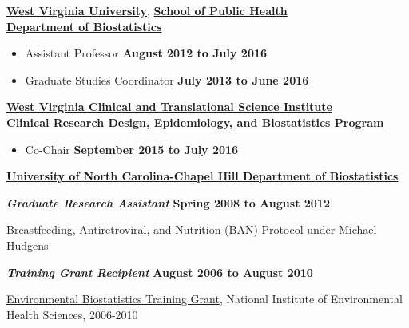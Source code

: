 \documentclass[10pt]{article}
\newenvironment{outerlist}[1][\enskip\textbullet]%
        {\begin{itemize}[#1]}{\end{itemize}%
         \vspace{-.6\baselineskip}}
\newenvironment{innerlist}[1][\enskip\textbullet]%
        {\begin{compactitem}[#1]}{\end{compactitem}}
\newcommand{\blankline}{\quad\pagebreak[2]}
\begin{document}
\blankline


\href{http://www.wvu.edu/}{\textbf{West Virginia University}}, \href{http://publichealth.hsc.wvu.edu/}{\textbf{School of Public Health}}\\
\href{http://publichealth.hsc.wvu.edu/biostatistics}{\textbf{Department of Biostatistics}}
\begin{outerlist}
\item[] {Assistant Professor} \normalfont%
				\hfill \textbf{August 2012 to July 2016}
				\item[] {Graduate Studies Coordinator} \normalfont%
        \hfill \textbf{July 2013 to June 2016}
\end{outerlist}

\blankline

\href{http://http://www.wvctsi.org/}{\textbf{West Virginia Clinical and Translational Science Institute}}\\
\href{http://http://www.wvctsi.org/programs/epidemiology-biostatistics/}{\textbf{Clinical Research Design, Epidemiology, and Biostatistics Program}}
\begin{outerlist}
\item[] {Co-Chair}\normalfont%
        \hfill \textbf{September 2015 to July 2016}
\end{outerlist}

\blankline

\href{http://www.bios.unc.edu}{\textbf{University of North Carolina-Chapel Hill Department of Biostatistics}}
\begin{outerlist}

\item[] \textit{\bf Graduate Research Assistant} \normalfont%
        \hfill \textbf{Spring 2008 to August 2012}
\begin{innerlist}
        \item Breastfeeding, Antiretroviral, and Nutrition (BAN) Protocol under Michael Hudgens
\end{innerlist}

\item[] \textit{\bf Training Grant Recipient}\normalfont%
        \hfill \textbf{August 2006 to August 2010}
        \begin{innerlist}
        \item \href{http://www.sph.unc.edu/bios/available_awards_175_6208.html#traininggrants}{Environmental Biostatistics Training Grant}, National Institute of Environmental Health Sciences, 2006-2010\\
\end{innerlist}
\end{outerlist}
\end{document}

